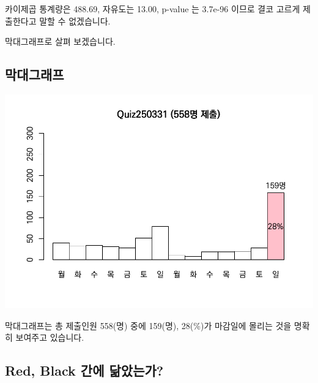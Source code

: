 \documentclass[
]{book}
\begin{document}
카이제곱 통계량은 488.69, 자유도는 13.00, p-value 는 3.7e-96 이므로 결코 고르게 제출한다고 말할 수 없겠습니다.

막대그래프로 살펴 보겠습니다.

\subsection{막대그래프}\label{uxb9c9uxb300uxadf8uxb798uxd504-4}

\includegraphics{Quiz_report_2025_files/figure-latex/unnamed-chunk-119-1.pdf}

막대그래프는 총 제출인원 558(명) 중에 159(명), 28(\%)가 마감일에 몰리는 것을 명확히 보여주고 있습니다.

\subsection{Red, Black 간에 닮았는가?}\label{red-black-uxac04uxc5d0-uxb2eeuxc558uxb294uxac00-4}
\end{document}

